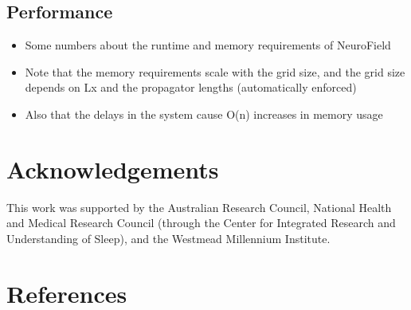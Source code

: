 \documentclass[preprint,review,10pt,authoryear,letterpaper]{elsarticle}
\begin{document}
\subsection{Performance}

\begin{itemize}
\item Some numbers about the runtime and memory requirements of NeuroField
\item Note that the memory requirements scale with the grid size, and the grid size depends on Lx and the propagator lengths (automatically enforced)
\item Also that the delays in the system cause O(n) increases in memory usage
\end{itemize}


\section{Acknowledgements}
\label{sec:acknowledgements}
This work was supported by the Australian Research Council, National Health and Medical Research Council (through the Center for Integrated Research and Understanding of Sleep), and the Westmead Millennium Institute.

\section{References}


\end{document}
